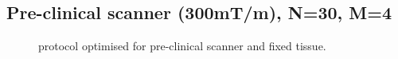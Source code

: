 \begin{subappendices}
{    \subsection{Pre-clinical scanner (300mT/m), N=30, M=4}
    \begin{figure}
    	[H] \centering  \caption{\SF protocol optimised for pre-clinical scanner and fixed tissue.} \label{fig:chapter7 exp1 FREEDIRS_300mT}
    \end{figure}
}
\end{subappendices}
